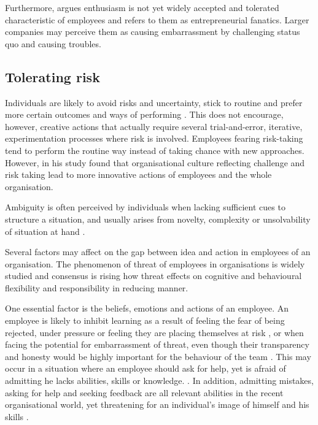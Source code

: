 Furthermore, \citet{quinn1985managing} argues enthusiasm is not yet widely accepted and tolerated characteristic of employees and refers to them as entrepreneurial fanatics. Larger companies may perceive them as causing embarrassment by challenging status quo and causing troubles. 

\subsection{Tolerating risk}
Individuals are likely to avoid risks and uncertainty, stick to routine and prefer more certain outcomes and ways of performing \citep{bazerman2012judgment}. This does not encourage, however, creative actions that actually require several trial-and-error, iterative, experimentation processes where risk is involved. Employees fearing risk-taking tend to perform the routine way instead of taking chance with new approaches. \citep{shalley2004leaders} However, in his study \citet{nystrom1990organizational} found that organisational culture reflecting challenge and risk taking lead to more innovative actions of employees and the whole organisation. 

Ambiguity is often perceived by individuals when lacking sufficient cues to structure a situation, and usually arises from novelty, complexity or unsolvability of situation at hand \citep{budner1962intolerance}. 

Several factors may affect on the gap between idea and action in employees of an organisation. The phenomenon of threat of employees in organisations is widely studied and consensus is rising how threat effects on cognitive and behavioural flexibility and responsibility in reducing manner. \citep{argyris1982reasoning,edmondson1999psychological}

One essential factor is the beliefs, emotions and actions of an employee. An employee is likely to inhibit learning as a result of feeling the fear of being rejected, under pressure or feeling they are placing themselves at risk \citep{edmondson1999psychological}, or when facing the potential for embarrassment of threat, even though their transparency and honesty would be highly important for the behaviour of the team \citep{argyris1982reasoning}. This may occur in a situation where an employee should ask for help, yet is afraid of admitting he lacks abilities, skills or knowledge. \citep{edmondson1999psychological}. In addition, admitting mistakes, asking for help and seeking feedback are all relevant abilities in the recent organisational world, yet threatening for an individual's image of himself and his skills \citep{brown1990politeness}.


